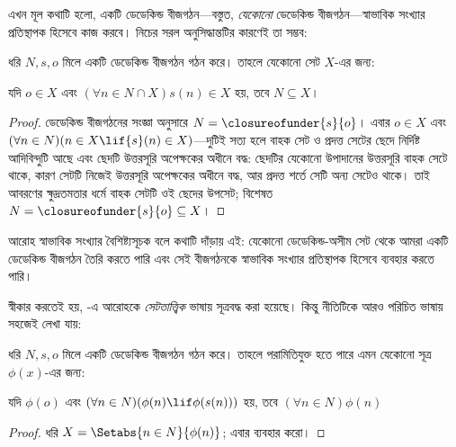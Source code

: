 \documentclass[../../../include/open-logic-section]{subfiles}
\begin{document}

এখন মূল কথাটি হলো, একটি ডেডেকিন্ড বীজগঠন—বস্তুত, \emph{যেকোনো} ডেডেকিন্ড বীজগঠন—স্বাভাবিক সংখ্যার প্রতিস্থাপক হিসেবে কাজ করবে। নিচের সরল অনুসিদ্ধান্তটির কারণেই তা সম্ভব:

\begin{thm}[গাণিতিক আরোহ]
ধরি $N, s, o$ মিলে একটি ডেডেকিন্ড বীজগঠন গঠন করে। তাহলে যেকোনো সেট $X$-এর জন্য:
	\begin{center}
		যদি $o \in X$ এবং $(\forall {n} \in N \cap X){s}({n}) \in X$ হয়, {তবে} $N \subseteq X$।
	\end{center}
\end{thm}

\begin{proof}
ডেডেকিন্ড বীজগঠনের সংজ্ঞা অনুসারে $N = \closureofunder{s}{o}$। এবার ${o} \in X$ এবং $(\forall {n} \in N)(n \in X \lif
{s}({n}) \in X)$—দুটিই সত্য হলে বাহক সেট ও প্রদত্ত সেটের ছেদে নির্দিষ্ট আদিবিন্দুটি আছে এবং ছেদটি উত্তরসূরি অপেক্ষকের অধীনে বদ্ধ: ছেদটির যেকোনো উপাদানের উত্তরসূরি বাহক সেটে থাকে, কারণ সেটটি নিজেই উত্তরসূরি অপেক্ষকের অধীনে বদ্ধ, আর প্রদত্ত শর্তে সেটি অন্য সেটেও থাকে। তাই আবরণের ক্ষুদ্রতমতার ধর্মে বাহক সেটটি ওই ছেদের উপসেট; বিশেষত $N = \closureofunder{s}{o} \subseteq X$।
\end{proof}

আরোহ স্বাভাবিক সংখ্যার বৈশিষ্ট্যসূচক বলে কথাটি দাঁড়ায় এই: যেকোনো ডেডেকিন্ড-অসীম সেট থেকে আমরা একটি ডেডেকিন্ড বীজগঠন তৈরি করতে পারি এবং সেই বীজগঠনকে স্বাভাবিক সংখ্যার প্রতিস্থাপক হিসেবে ব্যবহার করতে পারি।

স্বীকার করতেই হয়, -এ আরোহকে \emph{সেটতাত্ত্বিক} ভাষায় সূত্রবদ্ধ করা হয়েছে। কিন্তু নীতিটিকে আরও পরিচিত ভাষায় সহজেই লেখা যায়:

\begin{cor}
ধরি $N, s, o$ মিলে একটি ডেডেকিন্ড বীজগঠন গঠন করে। তাহলে পরামিতিযুক্ত হতে পারে এমন যেকোনো সূত্র $\phi(x)$-এর জন্য:
\begin{center}
	যদি $\phi(o)$ এবং $(\forall {n} \in N)(\phi(n)\lif
	\phi({s}({n})))$ হয়, {তবে} $(\forall n \in N)\phi(n)$
\end{center}
\end{cor}

\begin{proof}
ধরি $X = \Setabs{n \in N}{\phi(n)}$; এবার
 ব্যবহার করো।
\end{proof}
\end{document}
